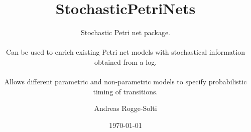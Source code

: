 \documentclass[12pt,oneside,a4paper]{scrreprt}
\newcommand{\mypackagename}{StochasticPetriNets\xspace}
\newcommand{\myauthor}{Andreas Rogge-Solti}
\newcommand{\mytitle}{\mypackagename}
\newcommand{\mysubtitle}{Stochastic Petri net package.\\~ \\
Can be used to enrich existing Petri net models with stochastical information obtained from a log.\\~ \\
Allows different parametric and non-parametric models to specify probabilistic timing of transitions.
}
\begin{document}
\begin{titlepage}
\author{\myauthor} 
\title{\mytitle} 
\subtitle{\mysubtitle}
\date{\today} 
\maketitle
\end{titlepage}









\end{document}
